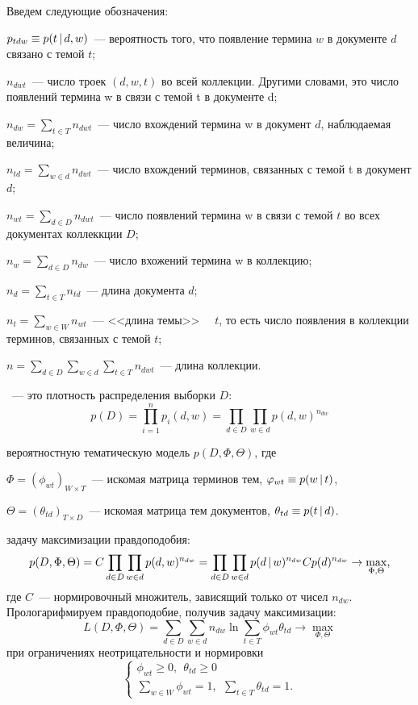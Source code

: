 \documentclass[12pt, twoside]{article}
\begin{document}
Введем следующие обозначения:

$p_{tdw} \equiv p(t \mspace{3mu}{|}\mspace{3mu} d,w)$~--- вероятность того, что появление термина $w$ в документе $d$ связано с темой $t$;

$n_{dwt}$~--- число троек $(d,w,t)$ во всей коллекции. Другими словами, это число появлений термина w в связи с темой t в документе d;

$n_{dw} = \sum_{t \in T} n_{dwt}$~--- число вхождений термина w в документ $d$,  наблюдаемая величина;

$n_{td} = \sum_{w \in d} n_{dwt}$~--- число вхождений  терминов, связанных с темой t в документ $d$;

$n_{wt} = \sum_{d \in D} n_{dwt}$~--- число появлений термина w в связи с темой $t$ во всех документах коллеккции $D$;

$n_{w} = \sum_{d \in D} n_{dw}$~--- число вхожений термина w в коллекцию;

$n_{d} = \sum_{t \in T} n_{td}$~--- длина документа $d$;

$n_{t} = \sum_{w \in W} n_{wt}$~--- <<длина темы>> \ \ $t$, то есть число появления  в коллекции терминов, связанных с темой $t$;

$n = \sum_{d \in D}\sum_{w \in d}\sum_{t \in T} n_{dwt}$~--- длина коллекции.

~---  это плотность распределения выборки $D$:
\[
p(D)=\prod^n_{i=1}p_i(d,w)=\prod_{d \in D}\prod_{w \in d}p(d,w)^{n_{dw}}
\]

 вероятностную тематическую модель $p(D,\Phi,\Theta)$, где 

$\Phi=(\phi_{wt})_{W \times T}$~--- искомая матрица терминов тем, $\varphi_{wt} \equiv p(w \mspace{3mu}{|}\mspace{3mu} t)$,

$\Theta=(\theta_{td})_{T \times D}$~--- искомая матрица тем документов, $\theta_{td}\equiv p(t \mspace{3mu}{|}\mspace{3mu} d)$.

 задачу максимизации правдоподобия:
\[
p(D,\Phi,\Theta)=C\prod_{d \in D}\prod_{w \in d}p(d,w)^{n_{dw}}=\prod_{d \in D}\prod_{w \in d}p(d \cond w)^{n_{dw}}Cp(d)^{n_{dw}} \to \max_{\Phi,\Theta},
\]
где $C$~--- нормировочный множитель, зависящий только от чисел $n_{dw}$. Прологарифмируем правдоподобие, получив задачу максимизации:
\begin{equation}
\label{plsa_optimization}
L(D,\Phi,\Theta)=\sum_{d \in D}\sum_{w \in d}n_{dw}\ln\sum_{t \in T}\phi_{wt}\theta_{td} \to \max_{\Phi,\Theta}
\end{equation}
при ограничениях неотрицательности и нормировки
\[
\left\{
	\begin{aligned}
		\phi_{wt} \geq 0,~~\theta_{td} \geq 0\\
		\sum_{w \in W} \phi_{wt} = 1,~~\sum_{t \in T} \theta_{td}  = 1.
	\end{aligned}
\right.
\]
\end{document}
